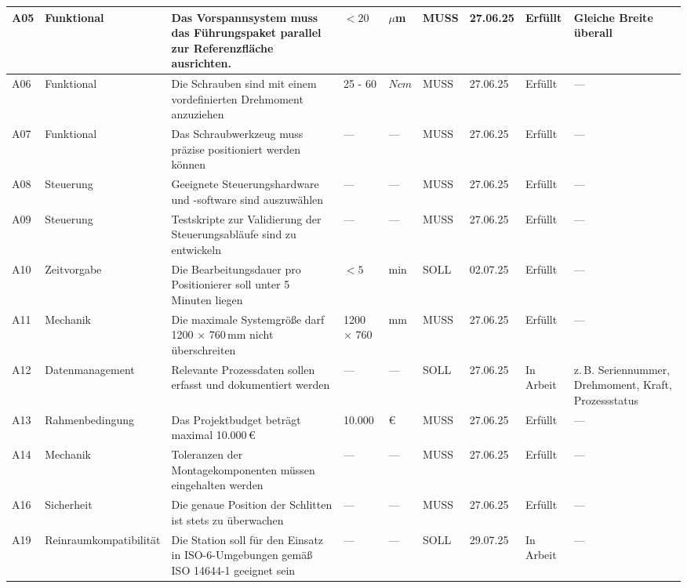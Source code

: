 \begin{landscape}
\begin{longtable}{|l|p{}|p{8.5cm}|l|l|l|l|l|p{4.0cm}|}
A05 & Funktional &
Das Vorspannsystem muss das Führungspaket parallel zur Referenzfläche ausrichten. &
$< 20$ & $\mu$m & MUSS & 27.06.25 & Erfüllt &
Gleiche Breite überall \\
\hline

A06 & Funktional &
Die Schrauben sind mit einem vordefinierten Drehmoment anzuziehen &
25 - 60 & $Ncm$ & MUSS & 27.06.25 & Erfüllt &
— \\
\hline

A07 & Funktional &
Das Schraubwerkzeug muss präzise positioniert werden können &
— & — & MUSS & 27.06.25 & Erfüllt &
— \\
\hline

A08 & Steuerung &
Geeignete Steuerungshardware und -software sind auszuwählen &
— & — & MUSS & 27.06.25 & Erfüllt &
— \\
\hline

A09 & Steuerung &
Testskripte zur Validierung der Steuerungsabläufe sind zu entwickeln &
— & — & MUSS & 27.06.25 & Erfüllt &
— \\
\hline

A10 & Zeitvorgabe &
Die Bearbeitungsdauer pro Positionierer soll unter 5 Minuten liegen &
$< 5$ & min & SOLL & 02.07.25 & Erfüllt &
— \\
\hline

A11 & Mechanik &
Die maximale Systemgröße darf 1200 × 760\,mm nicht überschreiten &
1200 × 760 & mm & MUSS & 27.06.25 & Erfüllt &
— \\
\hline

A12 & Daten\-management &
Relevante Prozessdaten sollen erfasst und dokumentiert werden &
— & — & SOLL & 27.06.25 & In Arbeit &
z.\,B. Seriennummer, Drehmoment, Kraft, Prozessstatus \\
\hline

A13 & Rahmen\-bedingung &
Das Projektbudget beträgt maximal 10.000\,€ &
10.000 & € & MUSS & 27.06.25 & Erfüllt &
— \\
\hline

A14 & Mechanik &
Toleranzen der Montagekomponenten müssen eingehalten werden &
— & — & MUSS & 27.06.25 & Erfüllt &
— \\
\hline

A16 & Sicherheit &
Die genaue Position der Schlitten ist stets zu überwachen &
— & — & MUSS & 27.06.25 & Erfüllt &
— \\
\hline

A19 & Reinraum\-kompatibilität &
Die Station soll für den Einsatz in ISO-6-Umgebungen gemäß ISO 14644-1 geeignet sein &
— & — & SOLL & 29.07.25 & In Arbeit &
— \\
\hline


\end{longtable}
\end{landscape}
